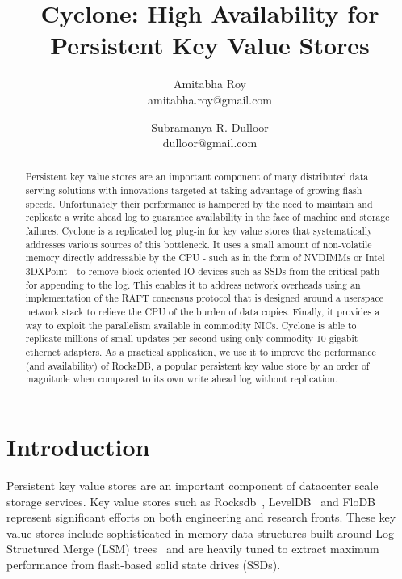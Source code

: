 \documentclass[twocolumn]{article}
\begin{document}
\title{Cyclone: High Availability for Persistent Key Value Stores}
\author{Amitabha Roy \\ amitabha.roy@gmail.com 
	     \and Subramanya R. Dulloor \\ dulloor@gmail.com}

\date{}
\maketitle


\begin{abstract}
\vspace{0.05in}
Persistent key value stores are an important component of many distributed data
serving solutions with innovations targeted at taking advantage of growing flash
speeds. Unfortunately their performance is hampered by the need to maintain and
replicate a write ahead log to guarantee availability in the face of machine and
storage failures. Cyclone is a replicated log plug-in for key value stores that
systematically addresses various sources of this bottleneck. It uses a small
amount of non-volatile memory directly addressable by the CPU - such as in the
form of NVDIMMs or Intel 3DXPoint - to remove block oriented IO devices such as
SSDs from the critical path for appending to the log. This enables it to address
network overheads using an implementation of the RAFT consensus protocol that is
designed around a userspace network stack to relieve the CPU of the burden of
data copies.  Finally, it provides a way to exploit the parallelism available in commodity NICs.  
Cyclone is able to replicate millions of small updates per second using only commodity 10
gigabit ethernet adapters. As a practical application, we use it to improve the
performance (and availability) of RocksDB, a popular persistent key value store
by an order of magnitude when compared to its own write ahead log without
replication.
\end{abstract}

\section{Introduction}
Persistent key value stores are an important component of datacenter scale
storage services. Key value stores such as Rocksdb~\cite{rocksdb},
LevelDB~\cite{leveldb} and FloDB~\cite{flodb} represent significant efforts on
both engineering and research fronts. These key value stores include
sophisticated in-memory data structures built around Log Structured Merge (LSM)
trees~\cite{lsmtree} and are heavily tuned to extract maximum performance from
flash-based solid state drives (SSDs).
\end{document}
